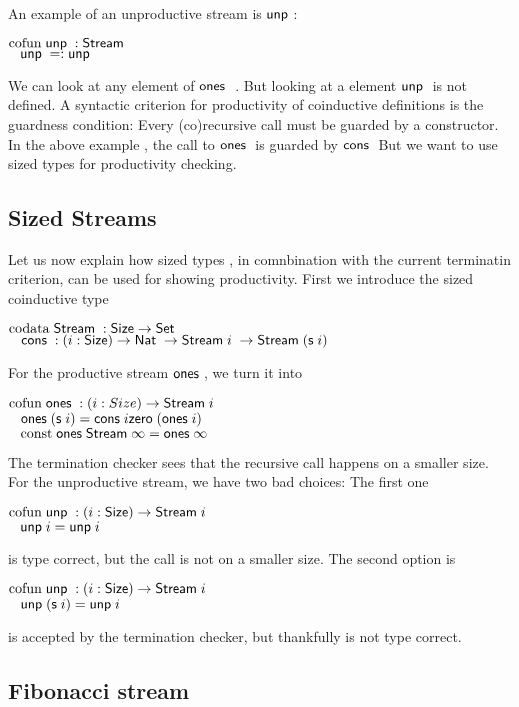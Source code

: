 An example of an unproductive stream is $\mathsf{unp}\;$:
\begin{bsp}
$\mathrm{cofun}\; \mathsf{unp}\; : \mathsf{Stream}\; $ \\
$\hspace*{3mm} \mathsf{unp}\; = : \mathsf{unp}\;$
\end{bsp}
We can look at any element of $\mathsf{ones}\;$ .
But looking at a element $\mathsf{unp}\;$ is not defined. 
A syntactic criterion for productivity of coinductive definitions is the guardness condition:
Every (co)recursive call must be guarded by a constructor.
In the above example , the call to $\mathsf{ones}\;$ is guarded by $\mathsf{cons}\;$
But we want to use sized types for productivity checking.
\subsection{Sized Streams}
Let us now explain how sized types , in comnbination with the current terminatin criterion, can be used for showing productivity.
First we introduce the sized coinductive type 
\begin{bsp}
$\mathrm{codata}\; \mathsf{Stream}\; : \mathsf{Size} \rightarrow \mathsf{Set} $ \\
$\hspace*{3mm} \mathsf{cons}\; : ( i : \mathsf{Size} ) \rightarrow{\mathsf{Nat}\;\rightarrow\mathsf{Stream}\;i \; \rightarrow\mathsf{Stream}\;(\mathsf{s}\;i) } $
\end{bsp}
For the productive stream $\mathsf{ones}\;$, we turn it into
\begin{bsp}
$\mathrm{cofun}\; \mathsf{ones}\;: ( i : Size ) \rightarrow{\mathsf{Stream}\;i} $ \\
$\hspace*{3mm} \mathsf{ones}\; (\mathsf{s}\; i) = \mathsf{cons}\; i \mathsf{zero}\; (\mathsf{ones}\; i)$\\
$\hspace*{3mm} \mathrm{const}\; \mathsf{ones}\; \mathsf{Stream}\; \infty = \mathsf{ones}\; \infty $
\end{bsp}
The termination checker sees that the recursive call happens on a smaller size.
For the unproductive stream, we have two bad choices:
The first one
\begin{bsp}
$\mathrm{cofun}\; \mathsf{unp}\; : ( i : \mathsf{Size} ) \rightarrow{\mathsf{Stream}\;i}$ \\
$\hspace*{3mm} \mathsf{unp}\; i =  \mathsf{unp}\; i$
\end{bsp}
is type correct, but the call is not on a smaller size.
The second option is
\begin{bsp}
$\mathrm{cofun}\; \mathsf{unp}\; : ( i : \mathsf{Size} ) \rightarrow{\mathsf{Stream}\;i}$ \\
$\hspace*{3mm} \mathsf{unp}\; (\mathsf{s}\; i) = \mathsf{unp}\; i $
\end{bsp}
is accepted by the termination checker, but thankfully is not type correct.
\subsection{Fibonacci stream}

